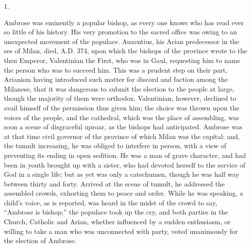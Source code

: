 1.

Ambrose was eminently a popular bishop, as every one knows who has
read ever so little of his history. His very promotion to the sacred
office was owing to an unexpected movement of the populace. Auxentius,
his Arian predecessor in the see of Milan, died, A.D.
374, upon which the bishops of the province wrote to the then Emperor,
Valentinian the First, who was in Gaul, requesting him to name the
person who was to succeed him. This was a prudent step on their part,
Arianism having introduced such matter for discord and faction among the Milanese, that it was dangerous to submit the election to
the people at large, though the majority of them were orthodox.
Valentinian, however, declined to avail himself of the permission thus
given him; the choice was thrown upon the voices of the people, and
the cathedral, which was the place of assembling, was soon a scene of
disgraceful uproar, as the bishops had anticipated. Ambrose was at
that time civil governor of the province of which Milan was the
capital: and, the tumult increasing, he was obliged to interfere in
person, with a view of preventing its ending in open sedition. He was
a man of grave character, and had been in youth brought up with a
sister, who had devoted herself to the service of God in a single
life; but as yet was only a catechumen, though he was half way between
thirty and forty. Arrived at the scene of tumult, he addressed the
assembled crowds, exhorting them to peace and order. While he was
speaking, a child's voice, as is reported, was heard in the midst of
the crowd to say, ``Ambrose is bishop;'' the populace took up
the cry, and both parties in the Church, Catholic and Arian, whether
influenced by a sudden enthusiasm, or willing to take a man who was
unconnected with party, voted unanimously for the election of Ambrose.

